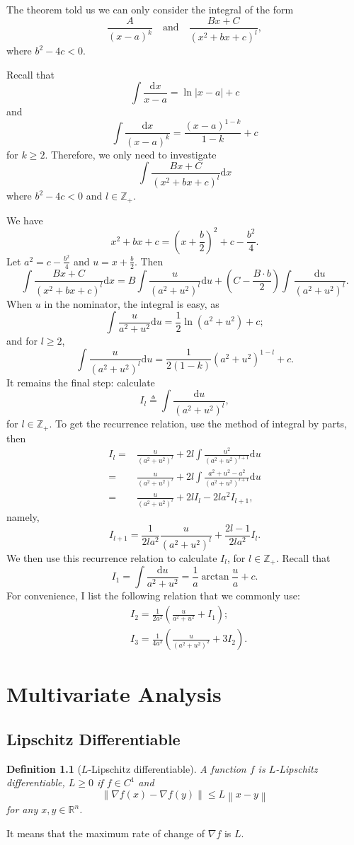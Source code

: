\documentclass[12pt,a4paper]{report}
\numberwithin{equation}{section}
\theoremstyle{mystyle}
\newtheorem{definition}{Definition}[section]
\newcommand{\R}{\mathbb{R}}
\newcommand{\Z}{\mathbb{Z}}
\renewcommand{\d}{\mathrm{d}}
\newcommand{\grad}{\nabla}
\newcommand{\abs}[1]{\left\lvert #1 \right\rvert}
\newcommand{\norm}[1]{\left\lVert #1 \right\rVert}
\begin{document}
	The theorem told us we can only consider the integral of the form
	$$\frac{A}{(x-a)^k} \quad \text{and}\quad   \frac{Bx+C}{(x^2+bx+c)^l},$$
	where $b^2-4c<0$.
	
	Recall that $$\int \frac{\d x}{x-a} = \ln \abs{x-a}+c$$ and $$\int\frac{\d x}{(x-a)^k}=\frac{(x-a)^{1-k}}{1-k}+c$$ for $k\geq 2$. Therefore, we only need to investigate $$\int  \frac{Bx+C}{(x^2+bx+c)^l} \d x$$ where $b^2-4c<0$ and $l\in \Z_{+}$.
	
	We have 
	$$
	x^2+bx+c=(x+\frac{b}{2})^2+c-\frac{b^2}{4}.
	$$
	Let $a^2=c-\frac{b^2}{4}$ and $u=x+\frac{b}{2}$. Then
	\[
	\int  \frac{Bx+C}{(x^2+bx+c)^l} \d x = B\int \frac{u}{(a^2+u^2)^l}\d u+(C-\frac{B\cdot b}{2})\int \frac{\d u}{(a^2+u^2)^l}.
	\]
	When $u$ in the nominator, the integral is easy, as 
	$$
	\int \frac{u}{a^2+u^2}\d u=\frac{1}{2}\ln (a^2+u^2)+c;$$ and for $l\geq 2$, 
	$$
	\int \frac{u}{(a^2+u^2)^l}\d u=\frac{1}{2(1-k)}(a^2+u^2)^{1-l}+c.
	$$ It remains the final step: calculate $$I_l\triangleq \int \frac{\d u}{(a^2+u^2)^l},$$ for $l\in \Z_+$.
	To get the recurrence relation, use the method of integral by parts, then
	\begin{align*}
		I_l =& \frac{u}{(a^2+u^2)^l}+2l\int \frac{u^2}{(a^2+u^2)^{l+1}}\d u\\
		=&\frac{u}{(a^2+u^2)^l}+2l\int\frac{a^2+u^2-a^2}{(a^2+u^2)^{l+1}}\d u\\
		=& \frac{u}{(a^2+u^2)^l}+2l I_l - 2la^2 I_{l+1},
	\end{align*}
	namely,
	\begin{equation}
		I_{l+1}=\frac{1}{2la^2}\frac{u}{(a^2+u^2)^l}+\frac{2l-1}{2la^2}I_l.
	\end{equation}
	We then use this recurrence relation to calculate $I_l$, for $l\in \Z_+$. Recall that 
	$$
	I_1=\int \frac{\d u}{a^2+u^2} = \frac{1}{a}\arctan{\frac{u}{a}}+c.
	$$
	For convenience, I list the following relation that we commonly use:
	\begin{align}
		&I_2=\frac{1}{2a^2}\left(\frac{u}{a^2+u^2}+I_1\right);\\
		&I_3 = \frac{1}{4a^2}\left(\frac{u}{(a^2+u^2)^2}+3I_2\right).
	\end{align}
	
	
	\chapter{Multivariate Analysis}
	\section{Lipschitz Differentiable}
	\begin{definition}[$L$-Lipschitz differentiable]
		A function $f$ is $L$-Lipschitz differentiable, $L\geq 0$ if $f\in C^1$ and
		$$
		\norm{\grad f(x)-\grad f(y)}\leq L\norm{x-y}
		$$
		for any $x,y\in \R^n$.
	\end{definition}
	It means that the maximum rate of change of $\grad f$ is $L$.
	
\end{document}
